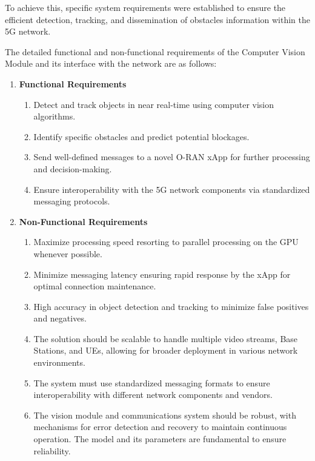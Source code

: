 To achieve this, specific system requirements were established to ensure the efficient detection, tracking, and dissemination of obstacles information within the 5G network.

The detailed functional and non-functional requirements of the Computer Vision Module and its interface with the network are as follows:

\begin{enumerate}
    \item \textbf{Functional Requirements}
    \begin{enumerate}
        \item Detect and track objects in near real-time using computer vision algorithms.
        \item Identify specific obstacles and predict potential blockages.
        \item Send well-defined messages to a novel O-RAN xApp for further processing and decision-making.
        \item Ensure interoperability with the 5G network components via standardized messaging protocols. %
    \end{enumerate}
    \item \textbf{Non-Functional Requirements}
    \begin{enumerate}
        \item Maximize processing speed resorting to parallel processing on the GPU whenever possible\@.
        \item Minimize messaging latency ensuring rapid response by the xApp for optimal connection maintenance.
        \item High accuracy in object detection and tracking to minimize false positives and negatives.
        \item The solution should be scalable to handle multiple video streams, Base Stations, and UEs, allowing for broader deployment in various network environments.
        \item The system must use standardized messaging formats to ensure interoperability with different network components and vendors.
        \item The vision module and communications system should be robust, with mechanisms for error detection and recovery to maintain continuous operation.
        The model and its parameters are fundamental to ensure reliability. %
    \end{enumerate}
\end{enumerate}

